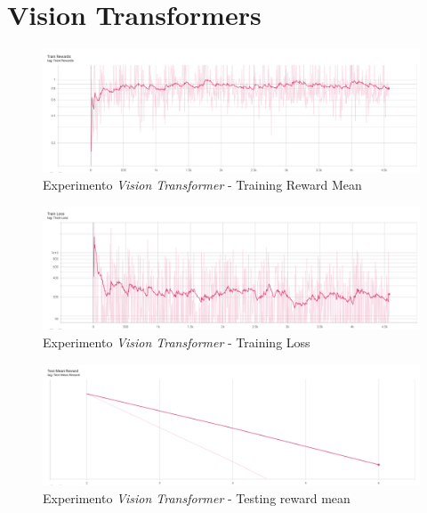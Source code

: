 \section{Vision Transformers}
\label{resultados-vision-transformers}

\begin{figure}[H]
	\centering
	\includegraphics[width=1\textwidth]{figuras/experiments/vision transformers/train_rewards.png}
	\caption[Experimento \textit{Vision Transformer} - Training Reward Mean]{Experimento \textit{Vision Transformer} - Training Reward Mean}
	\label{fig-experimento-vision-transformer-1-training-reward-mean}
\end{figure}
\begin{figure}[H]
	\centering
	\includegraphics[width=1\textwidth]{figuras/experiments/vision transformers/train_loss.png}
	\caption[Experimento \textit{Vision Transformer} - Training Loss]{Experimento \textit{Vision Transformer} - Training Loss}
	\label{fig-experimento-vision-transformer-1-training-loss}
\end{figure}
\begin{figure}[H]
	\centering
	\includegraphics[width=1\textwidth]{figuras/experiments/vision transformers/test_mean_reward.png}
	\caption[Experimento \textit{Vision Transformer} - Testing reward mean]{Experimento \textit{Vision Transformer} - Testing reward mean}
	\label{fig-experimento-vision-transformer-1-testing-reward-mean}
\end{figure}
